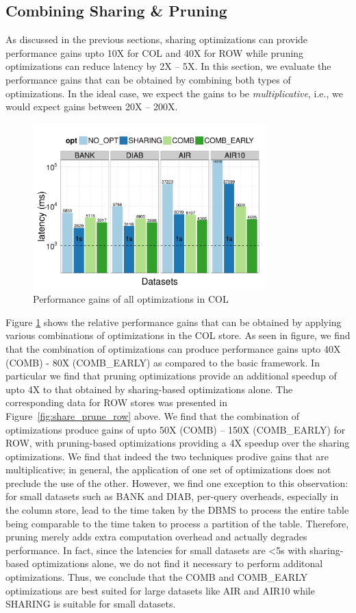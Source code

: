 \subsection{Combining Sharing \& Pruning}
\label{sec:sharing_and_pruning}
As discussed in the previous sections, sharing optimizations can provide performance gains upto 10X for COL and 40X for ROW while pruning optimizations can reduce latency by 2X -- 5X.
In this section, we evaluate the performance gains that can be obtained by combining both types of optimizations. 
In the ideal case, we expect the gains to be {\it multiplicative}, i.e., we would expect gains between 20X -- 200X.

\begin{figure}[h]
	\centering
	\includegraphics[width=9cm] {Images/all_opt_real_data_col.pdf}
	\caption{Performance gains of all optimizations in COL}
	\label{fig:share_prune_col}
	\vspace{-15pt}
\end{figure}

Figure \ref{fig:share_prune_col} shows the relative performance gains that can be obtained by applying various combinations of optimizations in the COL store. 
As seen in figure, we find that the combination of optimizations can produce performance gains upto 40X (COMB) - 80X (COMB\_EARLY) as compared to the basic \SeeDB framework.
In particular we find that pruning optimizations provide an additional speedup of upto 4X to that obtained by sharing-based optimizations alone.
The corresponding data for ROW stores was presented in Figure~\ref{fig:share_prune_row} above.
We find that the combination of optimizations produce gains of upto 50X (COMB) -- 150X (COMB\_EARLY) for ROW, with pruning-based
optimizations providing a 4X speedup over the sharing optimizations.
We find that indeed the two techniques prodive gains that are multiplicative; in general, the application of one set of optimizations does not preclude the use of the other.
However, we find one exception to this observation: for small datasets such as BANK and DIAB, per-query overheads, especially in the column store, lead to the time taken by the DBMS to process the entire
table being comparable to the time taken to process a partition of the table. 
Therefore, pruning merely adds extra computation overhead and actually degrades performance.
In fact, since the latencies for small datasets are <5s with sharing-based optimizations alone, we do not find it necessary to perform additonal optimizations.
Thus, we conclude that the COMB and COMB\_EARLY optimizations are best suited for large datasets like AIR and AIR10 while SHARING is suitable for small datasets. 

